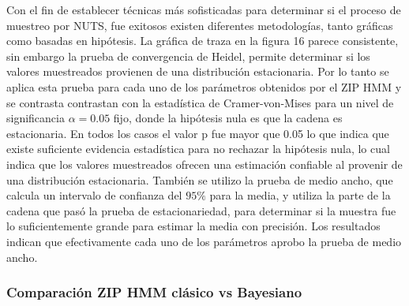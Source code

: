 \documentclass[a4paper]{article}\usepackage[]{graphicx}\usepackage[]{color}
\begin{document}
Con el fin de establecer técnicas más sofisticadas para determinar si el proceso de muestreo por NUTS, fue exitosos existen diferentes metodologías, tanto gráficas como basadas en hipótesis. La gráfica de traza en la figura 16 parece consistente, sin embargo la prueba de convergencia de Heidel, permite determinar si los valores muestreados provienen de una distribución estacionaria. Por lo tanto se aplica esta prueba para cada uno de los parámetros obtenidos por el ZIP HMM y se contrasta contrastan con la estadística de Cramer-von-Mises para un nivel de significancia $\alpha = 0.05$ fijo, donde la hipótesis nula es que la cadena es estacionaria. En todos los casos el valor p fue mayor que 0.05 lo que indica que existe suficiente evidencia estadística para no rechazar la hipótesis nula, lo cual indica que los valores muestreados ofrecen una estimación confiable al provenir de una distribución estacionaria. 
También se utilizo la prueba de medio ancho, que calcula un intervalo de confianza del $95 \%$ para la media, y utiliza la parte de la cadena que pasó la prueba de estacionariedad, para determinar si la muestra fue lo suficientemente grande para estimar la media con precisión. Los resultados indican que efectivamente cada uno de los parámetros aprobo la prueba de medio ancho.

\clearpage

\subsubsection{Comparación ZIP HMM clásico vs Bayesiano}
\end{document}
